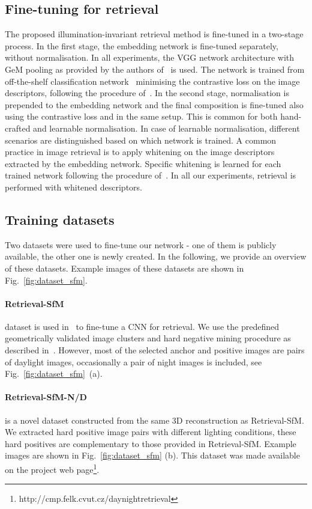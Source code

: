 \begin{figure*}
\section{Fine-tuning for retrieval}
The proposed illumination-invariant retrieval method is fine-tuned in a two-stage process.
In the first stage, the embedding network is fine-tuned separately, without normalisation. In all experiments, the VGG network architecture with GeM pooling as provided by the authors of~\cite{Radenovic-TPAMI18} is used. The network is trained from off-the-shelf classification network~\cite{SZ14} minimising the contrastive loss on the image descriptors, following the procedure of~\cite{Radenovic-TPAMI18}.
In the second stage, normalisation is prepended to the embedding network and the final composition is fine-tuned also using the contrastive loss and in the same setup. This is common for both hand-crafted and learnable normalisation. In case of learnable normalisation, different scenarios are distinguished based on which network is trained.
A common practice in image retrieval is to apply whitening on the image descriptors extracted by the embedding network. Specific whitening is learned for each trained network following the procedure of~\cite{Radenovic-TPAMI18}. In all our experiments, retrieval is performed with whitened descriptors.

\subsection{Training datasets}
Two datasets were used to fine-tune our network - one of them is publicly available, the other one is newly created. In the following, we provide an overview of these datasets. Example images of these datasets are shown in Fig.~\ref{fig:dataset_sfm}.

\paragraph{Retrieval-SfM} dataset is used in~\cite{Radenovic-TPAMI18} to fine-tune a CNN for retrieval. We use the predefined geometrically validated image clusters and hard negative mining procedure as described in~\cite{Radenovic-TPAMI18}. However, most of the selected anchor and positive images are pairs of daylight images, occasionally a pair of night images is included, see Fig.~\ref{fig:dataset_sfm}~(a). 

\paragraph{Retrieval-SfM-N/D} is a novel dataset constructed from the same 3D reconstruction as Retrieval-SfM. We extracted hard positive image pairs with different lighting conditions, these hard positives are complementary to those provided in Retrieval-SfM. Example images are shown in Fig.~\ref{fig:dataset_sfm} (b). This dataset was made available on the project web page\footnote{http://cmp.felk.cvut.cz/daynightretrieval}.


\end{figure*}
